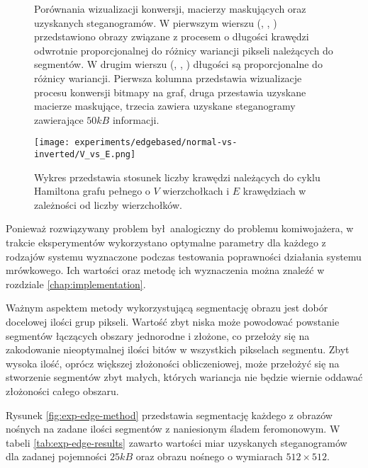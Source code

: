 {\begin{figure}
        \caption[Porównania wizualizacji konwersji oraz macierzy maskujących.]
        {
            Porównania wizualizacji konwersji, macierzy maskujących oraz uzyskanych steganogramów. W pierwszym wierszu
            (, , ) przedstawiono obrazy
            związane z procesem o długości krawędzi odwrotnie proporcjonalnej do różnicy wariancji pikseli należących do
            segmentów. W drugim wierszu (, ,
            ) długości są proporcjonalne do różnicy wariancji. Pierwsza kolumna
            przedstawia wizualizacje procesu konwersji bitmapy na graf, druga przestawia uzyskane macierze maskujące,
            trzecia zawiera uzyskane steganogramy zawierające $50kB$ informacji.
        }
        \label{fig:exp-edge}
    \end{figure}

    \begin{figure}
        \center
        \texttt{[image: experiments/edgebased/normal-vs-inverted/V\_vs\_E.png]}
        \caption
        {
            Wykres przedstawia stosunek liczby krawędzi należących do cyklu Hamiltona grafu pełnego o $V$ wierzchołkach
            i $E$ krawędziach w zależności od liczby wierzchołków.
        }
        \label{fig:exp-edge-v-vs-e}
    \end{figure}

    Ponieważ rozwiązywany problem był analogiczny do problemu komiwojażera, w trakcie eksperymentów wykorzystano
    optymalne parametry dla każdego z rodzajów systemu wyznaczone podczas testowania poprawności działania systemu
    mrówkowego. Ich wartości oraz metodę ich wyznaczenia można znaleźć w rozdziale \ref{chap:implementation}.

    Ważnym aspektem metody wykorzystującą segmentację obrazu jest dobór docelowej ilości grup pikseli. Wartość zbyt
    niska może powodować powstanie segmentów łączących obszary jednorodne i złożone, co przełoży się na zakodowanie
    nieoptymalnej ilości bitów w wszystkich pikselach segmentu. Zbyt wysoka ilość, oprócz większej złożoności
    obliczeniowej, może przełożyć się na stworzenie segmentów zbyt małych, których wariancja nie będzie wiernie oddawać
    złożoności całego obszaru.

    Rysunek \ref{fig:exp-edge-method} przedstawia segmentację każdego z obrazów nośnych na zadane ilości segmentów z
    naniesionym śladem feromonowym. W tabeli \ref{tab:exp-edge-results} zawarto wartości miar uzyskanych
    steganogramów dla zadanej pojemności $25kB$ oraz obrazu nośnego o wymiarach $512 \times 512$.

}
